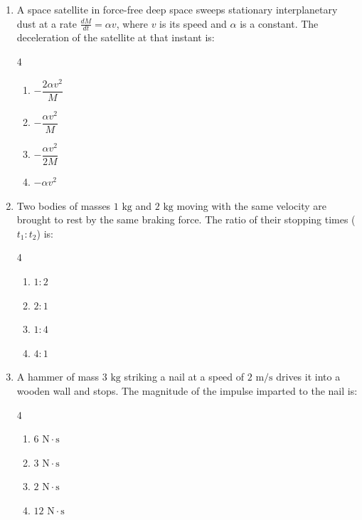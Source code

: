 \documentclass[11pt,a4paper]{article}
\begin{document}
\begin{enumerate}[label=\textbf{\arabic*.},leftmargin=18pt,itemsep=8pt]
  \item A space satellite in force-free deep space sweeps stationary interplanetary dust at a rate $\frac{dM}{dt} = \alpha v$, where $v$ is its speed and $\alpha$ is a constant. The deceleration of the satellite at that instant is:
  \begin{multicols}{4}
    \begin{enumerate}[label=(\Alph*)]
      \item $-\dfrac{2\alpha v^2}{M}$
      \item $-\dfrac{\alpha v^2}{M}$
      \item $-\dfrac{\alpha v^2}{2M}$
      \item $-\alpha v^2$
    \end{enumerate}
  \end{multicols}

  \item Two bodies of masses $1\text{ kg}$ and $2\text{ kg}$ moving with the same velocity are brought to rest by the same braking force. The ratio of their stopping times ($t_1 : t_2$) is:
  \begin{multicols}{4}
    \begin{enumerate}[label=(\Alph*)]
      \item $1 : 2$
      \item $2 : 1$
      \item $1 : 4$
      \item $4 : 1$
    \end{enumerate}
  \end{multicols}

  \item A hammer of mass $3\text{ kg}$ striking a nail at a speed of $2\text{ m/s}$ drives it into a wooden wall and stops. The magnitude of the impulse imparted to the nail is:
  \begin{multicols}{4}
    \begin{enumerate}[label=(\Alph*)]
      \item $6\text{ N}\cdot\text{s}$
      \item $3\text{ N}\cdot\text{s}$
      \item $2\text{ N}\cdot\text{s}$
      \item $12\text{ N}\cdot\text{s}$
    \end{enumerate}
  \end{multicols}


\end{enumerate}
\end{document}
